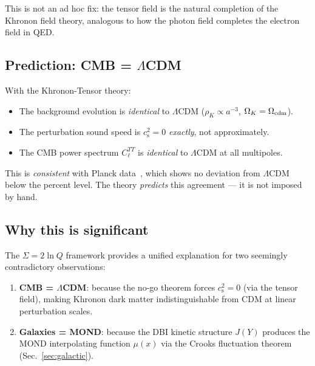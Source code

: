 \documentclass[prd,twocolumn,superscriptaddress,longbibliography,floatfix]{revtex4-2}
\newcommand{\cs}{c_{\mathrm{s}}}
\begin{document}
This is not an ad hoc fix: the tensor field is the natural completion
of the Khronon field theory, analogous to how the photon field
completes the electron field in QED.

\subsection{Prediction: CMB = \texorpdfstring{$\Lambda$CDM}{LCDM}}
\label{sec:cmb_prediction}

With the Khronon-Tensor theory:
\begin{itemize}
\item The background evolution is \emph{identical} to $\Lambda$CDM
  ($\rho_K \propto a^{-3}$, $\Omega_K = \Omega_{\rm cdm}$).
\item The perturbation sound speed is $\cs^2 = 0$ \emph{exactly},
  not approximately.
\item The CMB power spectrum $C_\ell^{TT}$ is \emph{identical}
  to $\Lambda$CDM at all multipoles.
\end{itemize}

This is \emph{consistent} with Planck data~\cite{Planck2018}, which
shows no deviation from $\Lambda$CDM below the percent level.  The
theory \emph{predicts} this agreement --- it is not imposed by hand.

\subsection{Why this is significant}
\label{sec:cmb_significance}

The $\Sigma = 2\ln Q$ framework provides a unified explanation for
two seemingly contradictory observations:
\begin{enumerate}
\item \textbf{CMB = $\Lambda$CDM}: because the no-go theorem forces
  $\cs^2 = 0$ (via the tensor field), making Khronon dark matter
  indistinguishable from CDM at linear perturbation scales.
\item \textbf{Galaxies = MOND}: because the DBI kinetic structure
  $J(Y)$ produces the MOND interpolating function $\mu(x)$ via the
  Crooks fluctuation theorem (Sec.~\ref{sec:galactic}).
\end{enumerate}
\end{document}
